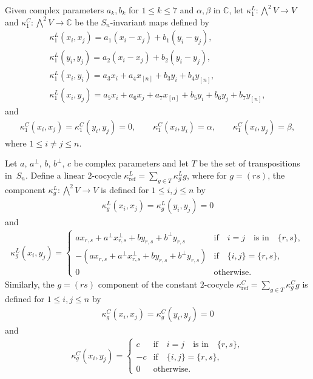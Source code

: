\documentclass[pdftex]{sigma}
\numberwithin{equation}{section}
\newcommand{\n}[1]{{#1}_{[n]}}
\DeclareMathOperator{\refl}{ref}
\begin{document}
\begin{Definition}\label{def:kappa1}
Given complex parameters $a_k, b_k$ for $1 \leq k \leq 7$ and $\alpha, \beta$ in $\mathbb{C}$,
let $\kappa^L_1\colon \bigwedge^2 V \to V$ and
$\kappa^C_1\colon \bigwedge^2 V\to \mathbb{C}$
be the $S_n$-invariant maps defined by
\begin{gather}
\label{kappaLxx}
\kappa^L_1(x_i,x_j)=a_1(x_i-x_j)+b_1(y_i-y_j), \\
\label{kappaLyy}
\kappa^L_1(y_i,y_j)=a_2(x_i-x_j)+b_2(y_i-y_j), \\
\label{kappaLxiyi}
\kappa^L_1(x_i,y_i)=a_3x_i+a_4\n{x}+b_3y_i+b_4\n{y}, \\
\label{kappaLxiyj}
\kappa^L_1(x_i,y_j)=a_5x_i+a_6x_j+a_7\n{x}+b_5y_i+b_6y_j+b_7\n{y},
\end{gather}
and
\begin{gather*}
\kappa^C_1(x_i,x_j)=\kappa^C_1(y_i,y_j)=0, \qquad \kappa^C_1(x_i,y_i)=\alpha, \qquad \kappa^C_1(x_i,y_j)=\beta,
\end{gather*}
where $1 \leq i \neq j \leq n$.
\end{Definition}


\begin{Definition}\label{def:kapparefl}
Let $a$, $a^\perp$, $b$, $b^\perp$, $c$ be complex parameters and let $T$ be the set of transpositions in~$S_n$.
Define a linear $2$-cocycle $\kappa^L_{\refl}=\sum_{g\in T}\kappa_g^Lg$, where for $g=(rs)$, the component $\kappa_g^L\colon \bigwedge^2 V\to V$ is defined for $1\leq i, j\leq n$ by
\begin{gather*}
\kappa_g^L(x_i,x_j)=\kappa_g^L(y_i,y_j)=0
\end{gather*}
and
\begin{gather*}
\kappa_g^L(x_i,y_j)=\begin{cases}
 ax_{r,s}+a^{\perp}x_{r,s}^{\perp}+by_{r,s}+b^{\perp}y_{r,s} & \text{if}\quad i=j\quad \text{is in}\quad \{r,s\},
 \\
 -(ax_{r,s}+a^{\perp}x_{r,s}^{\perp}+by_{r,s}+b^{\perp}y_{r,s}) & \text{if}\quad \{i,j\}=\{r,s\},
 \\
 0 & \text{otherwise.}
\end{cases}
\end{gather*}
Similarly, the $g=(rs)$ component of the constant $2$-cocycle $\kappa^C_{\refl}=\sum_{g\in T}\kappa_g^Cg$ is defined for $1\leq i, j\leq n$ by
\begin{gather*}
\kappa_g^C(x_i,x_j)=\kappa_g^C(y_i,y_j)=0
\end{gather*}
and
\begin{gather*}
\kappa_g^C(x_i,y_j)=\begin{cases}
c & \text{if}\quad i=j\quad \text{is in}\quad \{r,s\},
\\
-c & \text{if}\quad \{i,j\}=\{r,s\},
 \\
0 & \text{otherwise}.
\end{cases}
\end{gather*}
\end{Definition}
\end{document}
